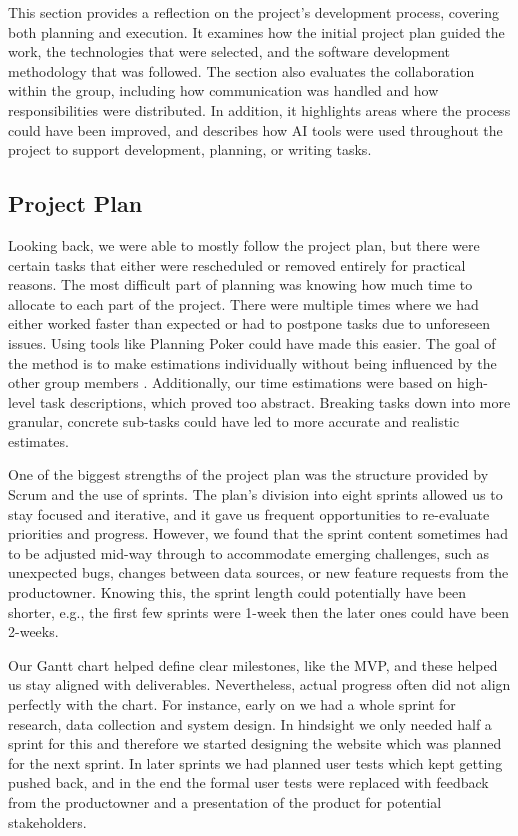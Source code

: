 This section provides a reflection on the project's development process, covering both planning and execution. It examines how the initial project plan guided the work, the technologies that were selected, and the software development methodology that was followed. The section also evaluates the collaboration within the group, including how communication was handled and how responsibilities were distributed. In addition, it highlights areas where the process could have been improved, and describes how AI tools were used throughout the project to support development, planning, or writing tasks.

\subsection{Project Plan}\label{subsec:discussion:process:projectplan}

Looking back, we were able to mostly follow the project plan, but there were certain tasks that either were rescheduled or removed entirely for practical reasons. The most difficult part of planning was knowing how much time to allocate to each part of the project. There were multiple times where we had either worked faster than expected or had to postpone tasks due to unforeseen issues. Using tools like Planning Poker could have made this easier. The goal of the method is to make estimations individually without being influenced by the other group members \cite{planningpokerwiki}. Additionally, our time estimations were based on high-level task descriptions, which proved too abstract. Breaking tasks down into more granular, concrete sub-tasks could have led to more accurate and realistic estimates.

One of the biggest strengths of the project plan was the structure provided by Scrum and the use of sprints. The plan's division into eight sprints allowed us to stay focused and iterative, and it gave us frequent opportunities to re-evaluate priorities and progress. However, we found that the sprint content sometimes had to be adjusted mid-way through to accommodate emerging challenges, such as unexpected bugs, changes between data sources, or new feature requests from the \gls{productowner}. Knowing this, the sprint length could potentially have been shorter, e.g., the first few sprints were 1-week then the later ones could have been 2-weeks. 

Our Gantt chart helped define clear milestones, like the MVP, and these helped us stay aligned with deliverables. Nevertheless, actual progress often did not align perfectly with the chart. For instance, early on we had a whole sprint for research, data collection and system design. In hindsight we only needed half a sprint for this and therefore we started designing the website which was planned for the next sprint. In later sprints we had planned user tests which kept getting pushed back, and in the end the formal user tests were replaced with feedback from the \gls{productowner} and a presentation of the product for potential stakeholders.

